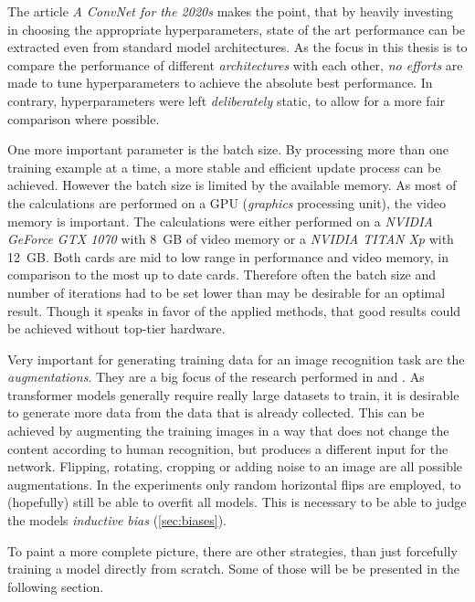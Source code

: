 The article \emph{A ConvNet for the 2020s} \cite{convNetForThe2020s} makes the point, that by heavily investing in choosing the appropriate hyperparameters, state of the art performance can be extracted even from \glqq standard\grqq{} model architectures. 
As the focus in this thesis is to compare the performance of different \emph{architectures} with each other, \emph{no efforts} are made to tune hyperparameters to achieve the absolute best performance. 
In contrary, hyperparameters were left \emph{deliberately} static, to allow for a more fair comparison where possible.

One more important parameter is the batch size. 
By processing more than one training example at a time, a more stable and efficient update process can be achieved.
However the batch size is limited by the available memory. 
As most of the calculations are performed on a GPU (\emph{graphics} processing unit), the video memory is important. 
The calculations were either performed on a \emph{NVIDIA GeForce GTX 1070} with \SI[]{8}[]{GB} of video memory or a \emph{NVIDIA TITAN Xp} with \SI[]{12}[]{GB}. 
Both cards are mid to low range in performance and video memory, in comparison to the most up to date cards. 
Therefore often the batch size and number of iterations had to be set lower than may be desirable for an optimal result. Though it speaks in favor of the applied methods, that good results could be achieved without top-tier hardware.

Very important for generating training data for an image recognition task are the \emph{augmentations}. 
They are a big focus of the research performed in \cite{convNetForThe2020s} and \cite{dinoPaper}.
As transformer models generally require really large datasets to train, it is desirable to generate more data from the data that is already collected. 
This can be achieved by augmenting the training images in a way that does not change the content according to human recognition, but produces a different input for the network.
Flipping, rotating, cropping or adding noise to an image are all possible augmentations. 
In the experiments only random horizontal flips are employed, to (hopefully) still be able to overfit all models. 
This is necessary to be able to judge the models \emph{inductive bias} (\autoref{sec:biases}).

To paint a more complete picture, there are other strategies, than just forcefully training a model directly from scratch. 
Some of those will be be presented in the following section.